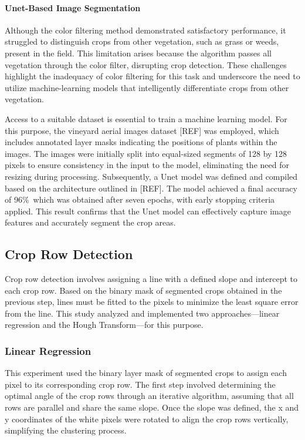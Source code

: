 \documentclass[conference]{IEEEtran}
\begin{document}
\paragraph{Unet-Based Image Segmentation}
Although the color filtering method demonstrated satisfactory performance, it struggled to distinguish crops from other vegetation, such as grass or weeds, present in the field. This limitation arises because the algorithm passes all vegetation through the color filter, disrupting crop detection. These challenges highlight the inadequacy of color filtering for this task and underscore the need to utilize machine-learning models that intelligently differentiate crops from other vegetation.

Access to a suitable dataset is essential to train a machine learning model. For this purpose, the vineyard aerial images dataset [REF] was employed, which includes annotated layer masks indicating the positions of plants within the images. The images were initially split into equal-sized segments of 128 by 128 pixels to ensure consistency in the input to the model, eliminating the need for resizing during processing. Subsequently, a Unet model was defined and compiled based on the architecture outlined in [REF]. The model achieved a final accuracy of 96\%\, which was obtained after seven epochs, with early stopping criteria applied. This result confirms that the Unet model can effectively capture image features and accurately segment the crop areas.



\subsection{Crop Row Detection}
Crop row detection involves assigning a line with a defined slope and intercept to each crop row. Based on the binary mask of segmented crops obtained in the previous step, lines must be fitted to the pixels to minimize the least square error from the line. This study analyzed and implemented two approaches—linear regression and the Hough Transform—for this purpose.

\subsubsection{Linear Regression}
This experiment used the binary layer mask of segmented crops to assign each pixel to its corresponding crop row. The first step involved determining the optimal angle of the crop rows through an iterative algorithm, assuming that all rows are parallel and share the same slope. Once the slope was defined, the x and y coordinates of the white pixels were rotated to align the crop rows vertically, simplifying the clustering process.
\end{document}
